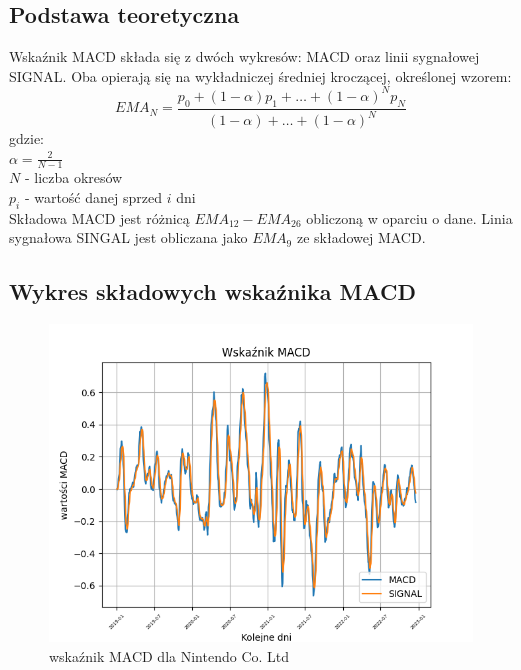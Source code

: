 \documentclass{article}
\newcommand{\companyName}{Nintendo Co. Ltd } %
\begin{document}
    \subsection{Podstawa teoretyczna}
    Wskaźnik MACD składa się z dwóch wykresów: MACD oraz linii sygnałowej SIGNAL. 
    Oba opierają się na wykładniczej średniej kroczącej, określonej wzorem: \\
    \begin{equation}
        EMA_{N} = \frac{p_{0} + (1-\alpha)p_{1} + \dots + (1-\alpha)^N p_{N}}{(1-\alpha) + \dots + (1-\alpha)^N}
    \end{equation}
    gdzie: \\ \newline
    $ \alpha = \frac{2}{N - 1} $ \\
    $ N $ - liczba okresów \\
    $ p_{i} $ - wartość danej sprzed $ i $ dni \\

    Składowa MACD jest różnicą $ EMA_{12} - EMA_{26} $ obliczoną w oparciu o dane. Linia sygnałowa SINGAL jest obliczana jako $ EMA_{9} $ ze składowej MACD.

    \subsection{Wykres składowych wskaźnika MACD}
    \begin{figure}[ht]
        \includegraphics[width=\textwidth]{MACD}
        \caption{wskaźnik MACD dla \companyName}
        \label{fig:macd}
    \end{figure}
\end{document}
